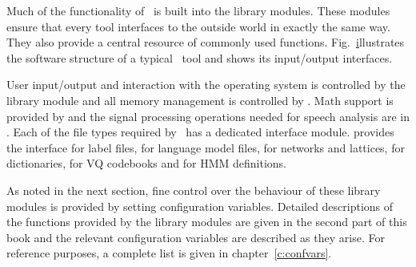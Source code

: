 
Much of the functionality of \HTK\ is built into the library modules. 
These modules ensure that every tool interfaces to the outside world 
in exactly the same way.  They also provide a central resource of 
commonly used functions.  Fig.~\href{f:softarch} illustrates 
the software
structure of a typical \HTK\ tool and shows its input/output interfaces.

User input/output and interaction with the operating system is 
controlled by the library 
module  and all memory management
is controlled by .  
Math support is provided by 
and the signal processing operations needed for speech analysis are
in .
Each of the file types required by \HTK\ has a dedicated
interface module.  
 provides the interface for label files,
 for language model files,
 for networks and lattices,
 for dictionaries,
 for VQ codebooks and
 for HMM definitions.


As noted in the next section, fine control over 
the behaviour of these library modules
is provided by setting configuration variables.  Detailed descriptions
of the functions provided by the library modules are given in the second
part of this book and the relevant configuration variables are described
as they arise.  For reference purposes, a complete list is given in
chapter~\ref{c:confvars}.

